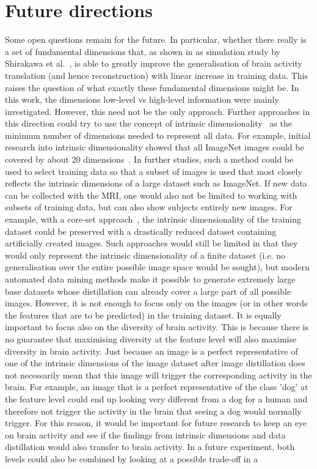 \section{Future directions}

Some open questions remain for the future. In particular, whether there really is a set of fundamental dimensions that, as shown in as simulation study by Shirakawa et al.~\cite{shirakawaSpuriousReconstructionBrain2024}, is able to greatly improve the generalisation of brain activity translation (and hence reconstruction) with linear increase in training data. This raises the question of what exactly these fundamental dimensions might be. In this work, the dimensions low-level vs high-level information were mainly investigated. However, this need not be the only approach. Further approaches in this direction could try to use the concept of intrinsic dimensionality~\cite{bennettIntrinsicDimensionalitySignal1969} as the minimum number of dimensions needed to represent all data. For example, initial research into intrinsic dimensionality showed that all ImageNet images could be covered by about 20 dimensions~\cite{popeIntrinsicDimensionImages2021}. In further studies, such a method could be used to select training data so that a subset of images is used that most closely reflects the intrinsic dimensions of a large dataset such as ImageNet. If new data can be collected with the MRI, one would also not be limited to working with subsets of training data, but can also show subjects entirely new images. For example, with a core-set approach~\cite{nguyenDatasetDistillationInfinitely2021,wangDatasetDistillation2018}, the intrinsic dimensionality of the training dataset could be preserved with a drastically reduced dataset containing artificially created images. Such approaches would still be limited in that they would only represent the intrinsic dimensionality of a finite dataset (i.e. no generalisation over the entire possible image space would be sought), but modern automated data mining methods make it possible to generate extremely large base datasets whose distillation can already cover a large part of all possible images. However, it is not enough to focus only on the images (or in other words the features that are to be predicted) in the training dataset. It is equally important to focus also on the diversity of brain activity. This is because there is no guarantee that maximising diversity at the feature level will also maximise diversity in brain activity. Just because an image is a perfect representative of one of the intrinsic dimensions of the image dataset after image distillation does not necessarily mean that this image will trigger the corresponding activity in the brain. For example, an image that is a perfect representative of the class 'dog' at the feature level could end up looking very different from a dog for a human and therefore not trigger the activity in the brain that seeing a dog would normally trigger. For this reason, it would be important for future research to keep an eye on brain activity and see if the findings from intrinsic dimensions and data distillation would also transfer to brain activity. In a future experiment, both levels could also be combined by looking at  a possible trade-off in a 